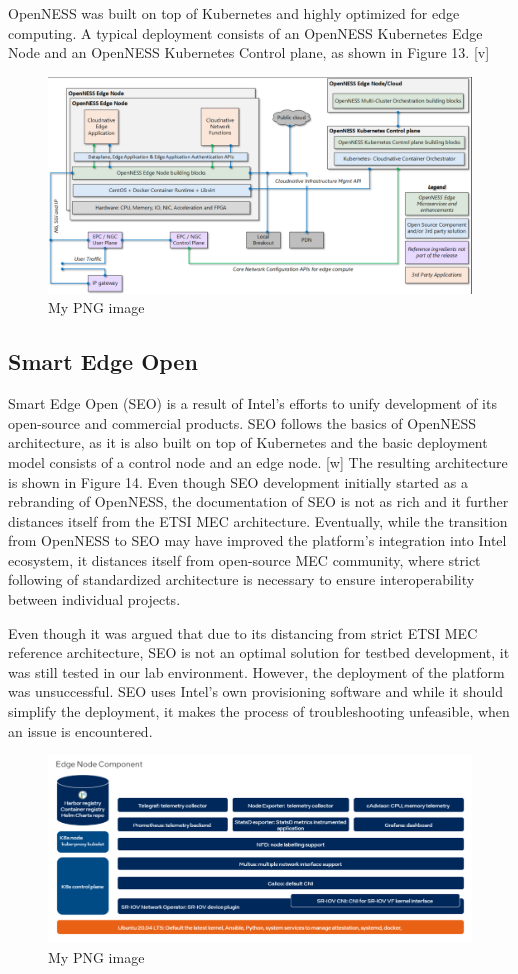 \documentclass[12pt,a4paper,twoside]{report}
\begin{document}
OpenNESS was built on top of Kubernetes and highly optimized for edge computing. A typical deployment consists of an OpenNESS Kubernetes Edge Node and an OpenNESS Kubernetes Control plane, as shown in Figure 13. [v]
\begin{figure}[ht]
	\centering
	\includegraphics[width=13cm]{./images/openness.png} 
	\caption{My PNG image}
\end{figure}

\subsection{Smart Edge Open}
Smart Edge Open (SEO) is a result of Intel’s efforts to unify development of its open-source and commercial products. SEO follows the basics of OpenNESS architecture, as it is also built on top of Kubernetes and the basic deployment model consists of a control node and an edge node. [w] The resulting architecture is shown in Figure 14. Even though SEO development initially started as a rebranding of OpenNESS, the documentation of SEO is not as rich and it further distances itself from the ETSI MEC architecture. Eventually, while the transition from OpenNESS to SEO may have improved the platform’s integration into Intel ecosystem, it distances itself from open-source MEC community, where strict following of standardized architecture is necessary to ensure interoperability between individual projects. 

Even though it was argued that due to its distancing from strict ETSI MEC reference architecture, SEO is not an optimal solution for testbed development, it was still tested in our lab environment. However, the deployment of the platform was unsuccessful. SEO uses Intel’s own provisioning software and while it should simplify the deployment, it makes the process of troubleshooting unfeasible, when an issue is encountered.
\begin{figure}[ht]
	\centering
	\includegraphics[width=13cm]{./images/intel-seo.png} 
	\caption{My PNG image}
\end{figure}
\end{document}
